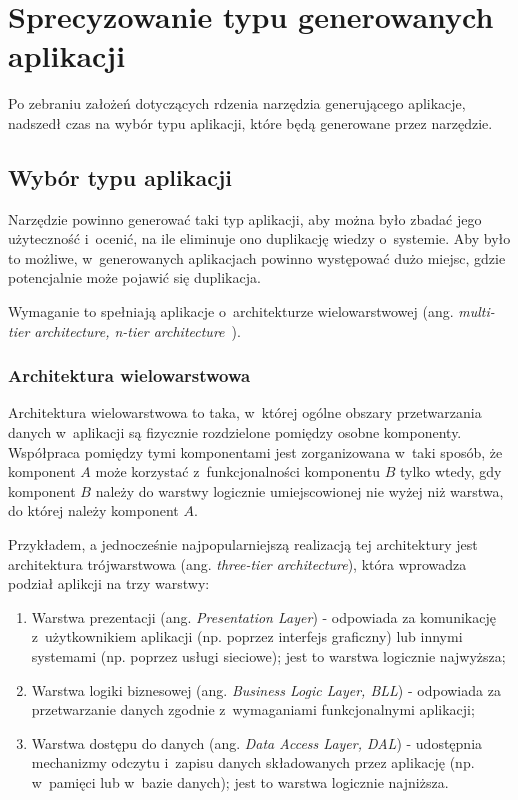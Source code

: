 \chapter{Sprecyzowanie typu generowanych aplikacji} \label{chap:generated_app_type}

Po zebraniu założeń dotyczących rdzenia narzędzia generującego aplikacje, nadszedł czas na wybór typu aplikacji, które będą generowane przez narzędzie.



\section{Wybór typu aplikacji}

Narzędzie powinno generować taki typ aplikacji, aby można było zbadać jego użyteczność i~ocenić, na ile eliminuje ono duplikację wiedzy o~systemie.
Aby było to możliwe, w~generowanych aplikacjach powinno występować dużo miejsc, gdzie potencjalnie może pojawić się duplikacja.

Wymaganie to spełniają aplikacje o~architekturze wielowarstwowej (ang. \emph{multi-tier architecture, n-tier architecture}~\cite{ntier}).


\subsection{Architektura wielowarstwowa} \label{sec:multitier}

Architektura wielowarstwowa to taka, w~której ogólne obszary przetwarzania danych w~aplikacji są fizycznie rozdzielone pomiędzy osobne komponenty.
Współpraca pomiędzy tymi komponentami jest zorganizowana w~taki sposób, że komponent $A$ może korzystać z~funkcjonalności komponentu $B$ tylko wtedy, gdy komponent $B$ należy do warstwy logicznie umiejscowionej nie wyżej niż warstwa, do której należy komponent $A$.

Przykładem, a jednocześnie najpopularniejszą realizacją tej architektury jest architektura trójwarstwowa (ang. \emph{three-tier architecture}), która wprowadza podział aplikcji na trzy warstwy:

\begin{enumerate}
 \item Warstwa prezentacji (ang. \emph{Presentation Layer}) - odpowiada za komunikację z~użytkownikiem aplikacji (np. poprzez interfejs graficzny) lub innymi systemami (np. poprzez usługi sieciowe); jest to warstwa logicznie najwyższa;
 \item Warstwa logiki biznesowej (ang. \emph{Business Logic Layer, BLL}) - odpowiada za przetwarzanie danych zgodnie z~wymaganiami funkcjonalnymi aplikacji;
 \item Warstwa dostępu do danych (ang. \emph{Data Access Layer, DAL}) - udostępnia mechanizmy odczytu i~zapisu danych składowanych przez aplikację (np. w~pamięci lub w~bazie danych); jest to warstwa logicznie najniższa.
\end{enumerate}

